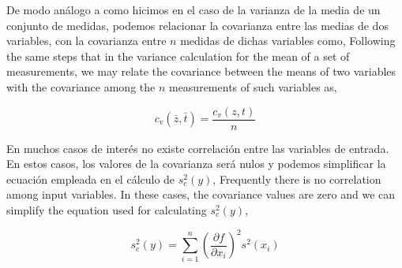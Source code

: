 \begin{paracol}{2}
De modo análogo a como hicimos en el caso de la varianza de la media de un conjunto de medidas, podemos relacionar la covarianza entre las medias de dos variables, con la covarianza entre $n$ medidas de dichas variables como,
\switchcolumn
Following the same steps that in the variance calculation for the mean of a set of measurements, we may relate the covariance between the means of two variables with the covariance among the $n$ measurements of such variables as, 
\end{paracol}
\begin{equation*}
c_v(\bar{z},\bar{t}) =\frac{c_v(z,t)}{n}
\end{equation*}
\begin{paracol}{2}
En muchos casos de interés no existe correlación entre las variables de entrada. En estos casos, los valores de la covarianza será nulos y podemos simplificar la ecuación empleada en el cálculo de $s_c^2(y)$,
\switchcolumn
Frequently there is no correlation among input variables. In these cases, the covariance values are zero and we can simplify the equation used for calculating $s_c^2(y)$,
\end{paracol}
\begin{equation*}
s_c^2(y) = \sum_{i=1}^n\left(\frac{\partial f}{\partial x_i}\right)^2 s^2(x_i)
\end{equation*}

